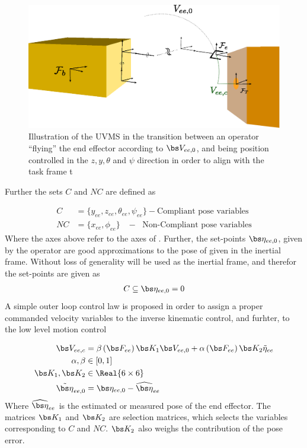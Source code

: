 \begin{figure}[h!]
	\centering
	\includegraphics[scale=0.7]{./figures/uvms_hot_stab2.eps}
	\caption{Illustration of the UVMS in the transition between an operator ``flying'' the end effector according to $\bs V_{ee,0}$, and being position controlled in the $z,y,\theta $ and $ \psi$ direction in order to align with the task frame \frame t}
	\label{fig:hot_stab2}
\end{figure}
Further the sets $C$ and $NC$ are defined as

\begin{align*}
	C&=\{y_{ee},z_{ee},\theta_{ee},\psi_{ee}\} - \text{Compliant pose variables}
	\\
	NC&=\{x_{ee},\phi_{ee}\} \; \; \; - \; \text{ Non-Compliant pose variables}
\end{align*}
Where the axes above refer to the axes of . Further, the set-points $\bs \eta_{ee,0}$, given by the operator are good approximations to the pose of  given in the inertial frame. Without loss of generality  will be used as the inertial frame, and therefor the set-points are given as  
\begin{align}
C \subseteq	\bs \eta_{ee,0}=0
	\label{eq:subset}
\end{align}
A simple outer loop control law is proposed in order to assign a proper commanded velocity variables to the inverse kinematic control, and furhter, to the low level motion control

\begin{align}
	\bs V_{ee,c} &= \beta \left( \bs F_{ee} \right) \bs K_{1}\bs V_{ee,0} + \alpha \left( \bs F_{ee} \right) \bs K_{2} \tilde{\eta}_{ee} 
	\label{eq:control_law1}
	\\
	\alpha, \beta &\in \left[ 0,1\right]
	\\
	\bs K_{1},\bs K_{2}&\in \Real{6 \times 6} \\
	\tilde{\bs \eta}_{ee,0}&= \bs \eta_{ee,0} - \widehat{\bs \eta}_{ee}
\end{align}
Where $\widehat{\bs \eta}_{ee}$ is the estimated or measured pose of the end effector. The matrices $\bs K_{1}$ and $ \bs K_{2}$ are selection matrices, which selects the variables corresponding to $C$ and $NC$. $\bs K_{2}$ also weighs the contribution of the pose error.  

